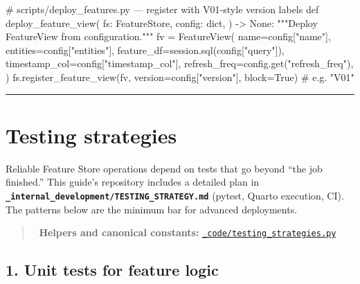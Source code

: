 \documentclass[
  letterpaper,
  DIV=11,
  numbers=noendperiod]{scrreprt}
\newenvironment{Shaded}{\begin{snugshade}}{\end{snugshade}}
\newcommand{\BuiltInTok}[1]{\textcolor[rgb]{0.00,0.23,0.31}{#1}}
\newcommand{\CommentTok}[1]{\textcolor[rgb]{0.37,0.37,0.37}{#1}}
\newcommand{\KeywordTok}[1]{\textcolor[rgb]{0.00,0.23,0.31}{#1}}
\newcommand{\NormalTok}[1]{\textcolor[rgb]{0.00,0.23,0.31}{#1}}
\newcommand{\OperatorTok}[1]{\textcolor[rgb]{0.37,0.37,0.37}{#1}}
\newcommand{\StringTok}[1]{\textcolor[rgb]{0.13,0.47,0.30}{#1}}
\newcommand{\VariableTok}[1]{\textcolor[rgb]{0.07,0.07,0.07}{#1}}
\begin{document}
\begin{Shaded}
\begin{Highlighting}[]
\CommentTok{\# scripts/deploy\_features.py — register with V01{-}style version labels}
\KeywordTok{def}\NormalTok{ deploy\_feature\_view(}
\NormalTok{    fs: FeatureStore,}
\NormalTok{    config: }\BuiltInTok{dict}\NormalTok{,}
\NormalTok{) }\OperatorTok{{-}\textgreater{}} \VariableTok{None}\NormalTok{:}
    \CommentTok{"""Deploy FeatureView from configuration."""}
\NormalTok{    fv }\OperatorTok{=}\NormalTok{ FeatureView(}
\NormalTok{        name}\OperatorTok{=}\NormalTok{config[}\StringTok{"name"}\NormalTok{],}
\NormalTok{        entities}\OperatorTok{=}\NormalTok{config[}\StringTok{"entities"}\NormalTok{],}
\NormalTok{        feature\_df}\OperatorTok{=}\NormalTok{session.sql(config[}\StringTok{"query"}\NormalTok{]),}
\NormalTok{        timestamp\_col}\OperatorTok{=}\NormalTok{config[}\StringTok{"timestamp\_col"}\NormalTok{],}
\NormalTok{        refresh\_freq}\OperatorTok{=}\NormalTok{config.get(}\StringTok{"refresh\_freq"}\NormalTok{),}
\NormalTok{    )}
\NormalTok{    fs.register\_feature\_view(fv, version}\OperatorTok{=}\NormalTok{config[}\StringTok{"version"}\NormalTok{], block}\OperatorTok{=}\VariableTok{True}\NormalTok{)  }\CommentTok{\# e.g. "V01"}
\end{Highlighting}
\end{Shaded}

\begin{center}\rule{0.5\linewidth}{0.5pt}\end{center}

\hypertarget{testing-strategies}{%
\section{Testing strategies}\label{testing-strategies}}

Reliable Feature Store operations depend on tests that go beyond ``the
job finished.'' This guide's repository includes a detailed plan in
\textbf{\texttt{\_internal\_development/TESTING\_STRATEGY.md}} (pytest,
Quarto execution, CI). The patterns below are the minimum bar for
advanced deployments.

\begin{quote}
📁 \textbf{Helpers and canonical constants:}
\href{_code/testing_strategies.py}{\texttt{\_code/testing\_strategies.py}}
\end{quote}

\hypertarget{unit-tests-for-feature-logic}{%
\subsection{1. Unit tests for feature
logic}\label{unit-tests-for-feature-logic}}
\end{document}
